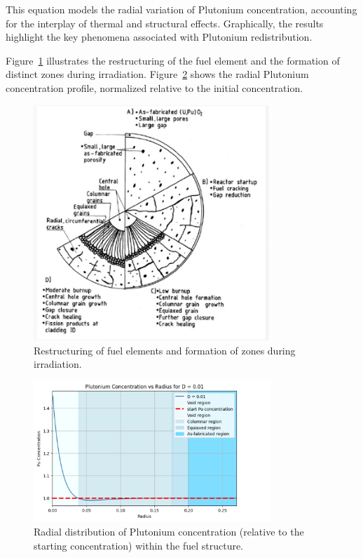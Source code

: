 This equation models the radial variation of Plutonium concentration, accounting for the interplay of thermal and structural effects. Graphically, the results highlight the key phenomena associated with Plutonium redistribution.

Figure~\ref{fig:Redistribution_Structure} illustrates the restructuring of the fuel element and the formation of distinct zones during irradiation. Figure~\ref{fig:Pu_Profile} shows the radial Plutonium concentration profile, normalized relative to the initial concentration.

\begin{figure}[H]
\centering
\includegraphics[width=0.8\textwidth]{Pu_redistributio_explaination.png}
\caption{Restructuring of fuel elements and formation of zones during irradiation.}
\label{fig:Redistribution_Structure}
\end{figure}

\begin{figure}[H]
\centering
\includegraphics[width=0.8\textwidth]{Pu_redistribution_profile.png}
\caption{Radial distribution of Plutonium concentration (relative to the starting concentration) within the fuel structure.}
\label{fig:Pu_Profile}
\end{figure}
